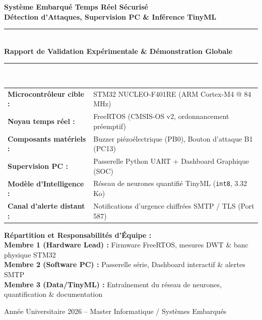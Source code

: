 \documentclass[a4paper,11pt]{article}
\begin{document}
\begin{titlepage}
  \centering
  \vspace*{1.5cm}
  {\Huge\bfseries\color{stblue}
    Système Embarqué Temps Réel Sécurisé\\[0.4em]
    \LARGE Détection d'Attaques, Supervision PC \& Inférence TinyML
  }\\[1.2cm]

  \rule{\linewidth}{1.5pt}\\[0.4cm]
  {\Large\bfseries Rapport de Validation Expérimentale \& Démonstration Globale}\\[0.2cm]
  \rule{\linewidth}{1.5pt}\\[1.8cm]

  \begin{tabular}{ll}
    \textbf{Microcontrôleur cible :} & STM32 NUCLEO-F401RE (ARM Cortex-M4 @ 84\,MHz) \\[0.3em]
    \textbf{Noyau temps réel :}      & FreeRTOS (CMSIS-OS v2, ordonnancement préemptif) \\[0.3em]
    \textbf{Composants matériels :}  & Buzzer piézoélectrique (PB0), Bouton d'attaque B1 (PC13) \\[0.3em]
    \textbf{Supervision PC :}        & Passerelle Python UART + Dashboard Graphique (SOC) \\[0.3em]
    \textbf{Modèle d'Intelligence :} & Réseau de neurones quantifié TinyML (\texttt{int8}, 3.32\,Ko) \\[0.3em]
    \textbf{Canal d'alerte distant :}& Notifications d'urgence chiffrées SMTP / TLS (Port 587) \\[0.3em]
  \end{tabular}

  \vfill
  \begin{mdframed}[backgroundcolor=boxgray, linecolor=borderblue, linewidth=1pt]
  \centering
  \textbf{Répartition et Responsabilités d'Équipe :}\\[0.3em]
  \small
  \textbf{Membre 1 (Hardware Lead) :} Firmware FreeRTOS, mesures DWT \& banc physique STM32\\
  \textbf{Membre 2 (Software PC) :} Passerelle série, Dashboard interactif \& alertes SMTP\\
  \textbf{Membre 3 (Data/TinyML) :} Entraînement du réseau de neurones, quantification \& documentation
  \end{mdframed}
  \vspace*{0.5cm}
  {\small Année Universitaire 2026 -- Master Informatique / Systèmes Embarqués}
\end{titlepage}
\end{document}

